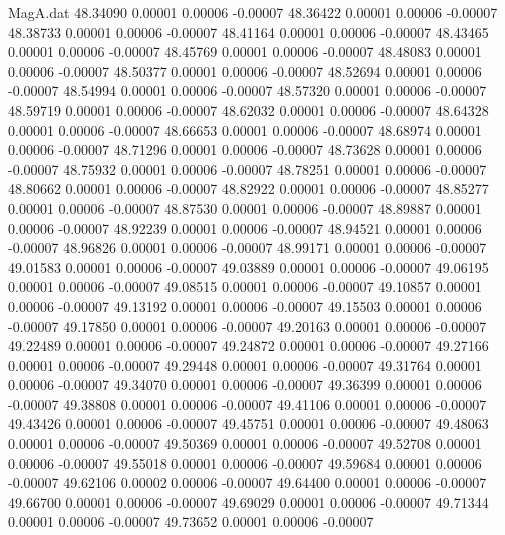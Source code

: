 \begin{filecontents}{MagA.dat}
  48.34090    0.00001    0.00006   -0.00007
  48.36422    0.00001    0.00006   -0.00007
  48.38733    0.00001    0.00006   -0.00007
  48.41164    0.00001    0.00006   -0.00007
  48.43465    0.00001    0.00006   -0.00007
  48.45769    0.00001    0.00006   -0.00007
  48.48083    0.00001    0.00006   -0.00007
  48.50377    0.00001    0.00006   -0.00007
  48.52694    0.00001    0.00006   -0.00007
  48.54994    0.00001    0.00006   -0.00007
  48.57320    0.00001    0.00006   -0.00007
  48.59719    0.00001    0.00006   -0.00007
  48.62032    0.00001    0.00006   -0.00007
  48.64328    0.00001    0.00006   -0.00007
  48.66653    0.00001    0.00006   -0.00007
  48.68974    0.00001    0.00006   -0.00007
  48.71296    0.00001    0.00006   -0.00007
  48.73628    0.00001    0.00006   -0.00007
  48.75932    0.00001    0.00006   -0.00007
  48.78251    0.00001    0.00006   -0.00007
  48.80662    0.00001    0.00006   -0.00007
  48.82922    0.00001    0.00006   -0.00007
  48.85277    0.00001    0.00006   -0.00007
  48.87530    0.00001    0.00006   -0.00007
  48.89887    0.00001    0.00006   -0.00007
  48.92239    0.00001    0.00006   -0.00007
  48.94521    0.00001    0.00006   -0.00007
  48.96826    0.00001    0.00006   -0.00007
  48.99171    0.00001    0.00006   -0.00007
  49.01583    0.00001    0.00006   -0.00007
  49.03889    0.00001    0.00006   -0.00007
  49.06195    0.00001    0.00006   -0.00007
  49.08515    0.00001    0.00006   -0.00007
  49.10857    0.00001    0.00006   -0.00007
  49.13192    0.00001    0.00006   -0.00007
  49.15503    0.00001    0.00006   -0.00007
  49.17850    0.00001    0.00006   -0.00007
  49.20163    0.00001    0.00006   -0.00007
  49.22489    0.00001    0.00006   -0.00007
  49.24872    0.00001    0.00006   -0.00007
  49.27166    0.00001    0.00006   -0.00007
  49.29448    0.00001    0.00006   -0.00007
  49.31764    0.00001    0.00006   -0.00007
  49.34070    0.00001    0.00006   -0.00007
  49.36399    0.00001    0.00006   -0.00007
  49.38808    0.00001    0.00006   -0.00007
  49.41106    0.00001    0.00006   -0.00007
  49.43426    0.00001    0.00006   -0.00007
  49.45751    0.00001    0.00006   -0.00007
  49.48063    0.00001    0.00006   -0.00007
  49.50369    0.00001    0.00006   -0.00007
  49.52708    0.00001    0.00006   -0.00007
  49.55018    0.00001    0.00006   -0.00007
  49.59684    0.00001    0.00006   -0.00007
  49.62106    0.00002    0.00006   -0.00007
  49.64400    0.00001    0.00006   -0.00007
  49.66700    0.00001    0.00006   -0.00007
  49.69029    0.00001    0.00006   -0.00007
  49.71344    0.00001    0.00006   -0.00007
  49.73652    0.00001    0.00006   -0.00007

\end{filecontents}
